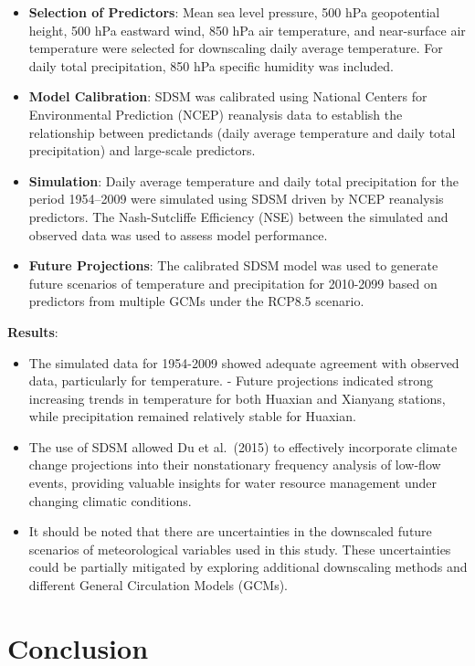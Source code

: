 \documentclass[
]{krantz}
\providecommand{\tightlist}{%
  \setlength{\itemsep}{0pt}\setlength{\parskip}{0pt}}
\begin{document}
\begin{itemize}
\item
  \textbf{Selection of Predictors}: Mean sea level pressure, 500 hPa geopotential height, 500 hPa eastward wind, 850 hPa air temperature, and near-surface air temperature were selected for downscaling daily average temperature. For daily total precipitation, 850 hPa specific humidity was included.
\item
  \textbf{Model Calibration}: SDSM was calibrated using National Centers for Environmental Prediction (NCEP) reanalysis data to establish the relationship between predictands (daily average temperature and daily total precipitation) and large-scale predictors.
\item
  \textbf{Simulation}: Daily average temperature and daily total precipitation for the period 1954--2009 were simulated using SDSM driven by NCEP reanalysis predictors. The Nash-Sutcliffe Efficiency (NSE) between the simulated and observed data was used to assess model performance.
\item
  \textbf{Future Projections}: The calibrated SDSM model was used to generate future scenarios of temperature and precipitation for 2010-2099 based on predictors from multiple GCMs under the RCP8.5 scenario.
\end{itemize}

\textbf{Results}:

\begin{itemize}
\tightlist
\item
  The simulated data for 1954-2009 showed adequate agreement with observed data, particularly for temperature. - Future projections indicated strong increasing trends in temperature for both Huaxian and Xianyang stations, while precipitation remained relatively stable for Huaxian.
\item
  The use of SDSM allowed Du et al.~(2015) to effectively incorporate climate change projections into their nonstationary frequency analysis of low-flow events, providing valuable insights for water resource management under changing climatic conditions.
\item
  It should be noted that there are uncertainties in the downscaled future scenarios of meteorological variables used in this study. These uncertainties could be partially mitigated by exploring additional downscaling methods and different General Circulation Models (GCMs).
\end{itemize}

\section{Conclusion}\label{conclusion-3}
\end{document}
